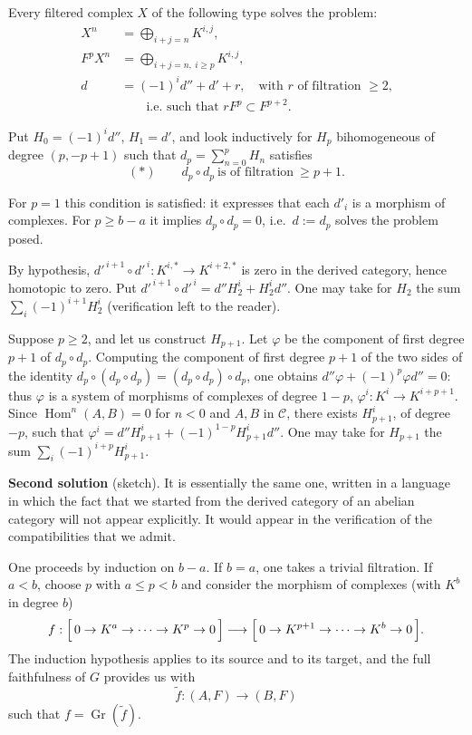 \documentclass[12pt,oneside]{amsbook}
\theoremstyle{plain}
\theoremstyle{definition}
\newcommand{\cC}{\mathcal{C}}   \newcommand{\cD}{\mathcal{D}}
\DeclareMathOperator{\Hom}{Hom}
\DeclareMathOperator{\Gr}{Gr}
\begin{document}
Every filtered complex $X$ of the following type solves the problem:
\begin{align*}
X^n &= \bigoplus_{i+j=n} K^{i,j},\\[1mm]
F^pX^n &= \bigoplus_{i+j=n,\ i \ge p} K^{i,j},\\[1mm]
d &= (-1)^i d'' + d' + r, \quad\text{with $r$ of filtration $\ge 2$,}\\
&\qquad\text{i.e.\ such that } rF^p \subset F^{p+2}.
\end{align*}

Put $H_0 = (-1)^i d''$, $H_1 = d'$, and look inductively for $H_p$ bihomogeneous of degree $(p,-p+1)$ such that $d_p = \sum_{n=0}^{p} H_n$ satisfies
\[
(*)\qquad d_p \circ d_p \ \text{is of filtration} \ \ge p+1 .
\]

For $p=1$ this condition is satisfied: it expresses that each $d'_i$ is a morphism of complexes. For $p \ge b-a$ it implies $d_p\circ d_p = 0$, i.e.\ $d := d_p$ solves the problem posed.

By hypothesis, $d'^{\,i+1}\circ d'^{\,i} : K^{i,*} \to K^{i+2,*}$ is zero in the derived category, hence homotopic to zero. Put $d'^{\,i+1}\circ d'^{\,i} = d''H_2^i + H_2^i d''$. One may take for $H_2$ the sum $\sum_i (-1)^{i+1}H_2^i$ (verification left to the reader).

Suppose $p \ge 2$, and let us construct $H_{p+1}$. Let $\varphi$ be the component of first degree $p+1$ of $d_p \circ d_p$. Computing the component of first degree $p+1$ of the two sides of the identity $d_p\circ(d_p\circ d_p) = (d_p\circ d_p)\circ d_p$, one obtains $d''\varphi + (-1)^p \varphi d'' = 0$: thus $\varphi$ is a system of morphisms of complexes of degree $1-p$, $\varphi^i : K^i \to K^{i+p+1}$. Since $\Hom^n(A,B)=0$ for $n<0$ and $A,B$ in $\cC$, there exists $H_{p+1}^i$, of degree $-p$, such that $\varphi^i = d''H_{p+1}^i + (-1)^{1-p}H_{p+1}^i d''$. One may take for $H_{p+1}$ the sum $\sum_i (-1)^{i+p}H_{p+1}^i$.

\medskip
\noindent\textbf{Second solution} (sketch). It is essentially the same one, written in a language in which the fact that we started from the derived category of an abelian category will not appear explicitly. It would appear in the verification of the compatibilities that we admit.

One proceeds by induction on $b-a$. If $b=a$, one takes a trivial filtration. If $a<b$, choose $p$ with $a \le p < b$ and consider the morphism of complexes (with $K^b$ in degree $b$)
\[
f : \Bigl[\,0 \to K^a \to \cdots \to K^p \to 0\,\Bigr]
\longrightarrow
\Bigl[\,0 \to K^{p+1} \to \cdots \to K^b \to 0\,\Bigr].
\]
The induction hypothesis applies to its source and to its target, and the full faithfulness of $G$ provides us with
\[
\tilde f : (A,F) \longrightarrow (B,F)
\]
such that $f = \Gr(\tilde f)$.
\end{document}
